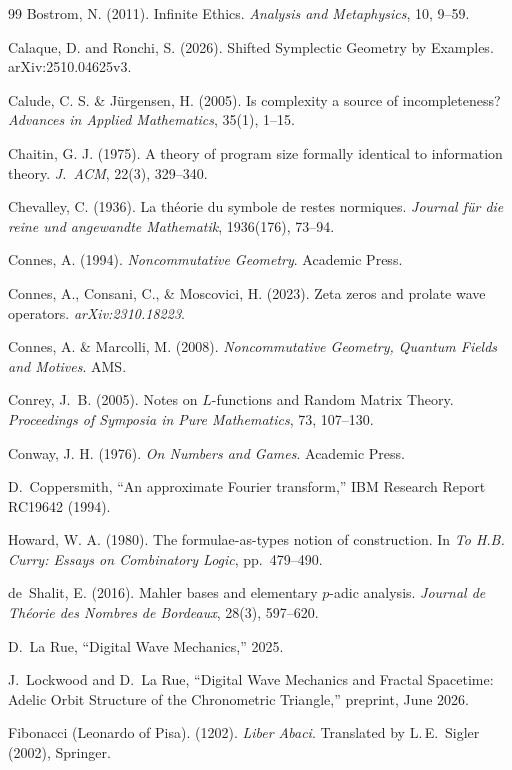 \documentclass[12pt,oneside]{book}
\begin{document}
\begin{thebibliography}{99}
Bostrom, N. (2011). Infinite Ethics. \emph{Analysis and Metaphysics}, 10, 9--59.

Calaque, D. and Ronchi, S. (2026). Shifted Symplectic Geometry by Examples. arXiv:2510.04625v3.

Calude, C. S. \& J\"urgensen, H. (2005). Is complexity a source of incompleteness? \emph{Advances in Applied Mathematics}, 35(1), 1--15.

Chaitin, G. J. (1975). A theory of program size formally identical to information theory. \emph{J.\ ACM}, 22(3), 329--340.

Chevalley, C. (1936). La th\'eorie du symbole de restes normiques. \emph{Journal f\"ur die reine und angewandte Mathematik}, 1936(176), 73--94.

Connes, A. (1994). \emph{Noncommutative Geometry}. Academic Press.

Connes, A., Consani, C., \& Moscovici, H. (2023). Zeta zeros and prolate wave operators. \emph{arXiv:2310.18223}.

Connes, A. \& Marcolli, M. (2008). \emph{Noncommutative Geometry, Quantum Fields and Motives}. AMS.

Conrey, J.~B. (2005).
Notes on $L$-functions and Random Matrix Theory.
\emph{Proceedings of Symposia in Pure Mathematics}, 73, 107--130.

Conway, J. H. (1976). \emph{On Numbers and Games}. Academic Press.

D.~Coppersmith,
``An approximate Fourier transform,''
IBM Research Report RC19642 (1994).

Howard, W. A. (1980). The formulae-as-types notion of construction. In \emph{To H.B. Curry: Essays on Combinatory Logic}, pp.~479--490.

de~Shalit, E. (2016).
Mahler bases and elementary $p$-adic analysis.
\emph{Journal de Th\'eorie des Nombres de Bordeaux}, 28(3), 597--620.

D.~La Rue,
``Digital Wave Mechanics,'' 2025.

J.~Lockwood and D.~La Rue, ``Digital Wave Mechanics and Fractal Spacetime: Adelic Orbit Structure of the Chronometric Triangle,'' preprint, June 2026.

Fibonacci (Leonardo of Pisa). (1202). \emph{Liber Abaci}. Translated by L.\,E.\ Sigler (2002), Springer.


\end{thebibliography}
\end{document}
